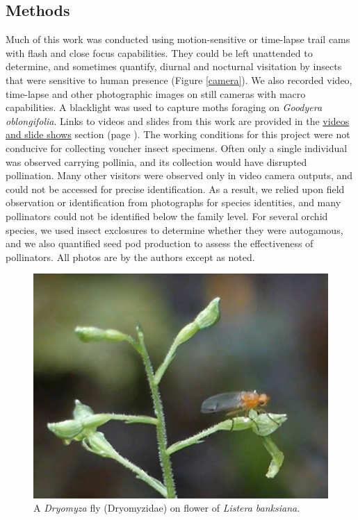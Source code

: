 \begin{multicols}{2}
\section{Methods}

Much of this work was conducted using motion-sensitive or time-lapse
trail cams with flash and close focus capabilities. They could be left
unattended to determine, and sometimes quantify, diurnal and nocturnal
visitation by insects that were sensitive to human presence (Figure \ref{camera}).
We also recorded video, time-lapse and other photographic images on
still cameras with macro capabilities. A blacklight was used to capture
moths foraging on \emph{Goodyera oblongifolia}. Links to videos and
slides from this work are provided in the \hyperref[videos]{videos and slide shows} section (page \pageref{videos}). The working conditions
for this project were not conducive for collecting voucher insect
specimens. Often only a single individual was observed carrying
pollinia, and its collection would have disrupted pollination. Many
other visitors were observed only in video camera outputs, and could not
be accessed for precise identification. As a result, we relied upon
field observation or identification from photographs for species
identities, and many pollinators could not be identified below the
family level. For several orchid species, we used insect exclosures to
determine whether they were autogamous, and we also quantified seed pod
production to assess the effectiveness of pollinators.  All photos are by the authors except as noted.

\begin{figure}[H]
\begin{center}
\vspace{2mm}
\includegraphics[width=\textwidth]{img/Listera_banksiana_Dryomyza.jpg}
\caption{A \emph{Dryomyza} fly (Dryomyzidae) on flower of \emph{Listera banksiana}.}
\label{Listera_banksiana_Dryomyza}
\end{center}
\end{figure} 



\end{multicols}
